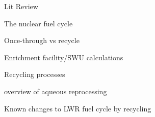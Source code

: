 \documentclass{report}
\begin{document}
\begin{outline}
\item Lit Review
\begin{outline}
    \item The nuclear fuel cycle
    \begin{outline}
          \item Once-through vs recycle \cite{tsoulfanidis_nuclear_2013}
          \item Enrichment facility/SWU calculations \cite{tsoulfanidis_nuclear_2013}
          \item Recycling processes \cite{tsoulfanidis_nuclear_2013}
          \begin{outline}
              \item overview of aqueous reprocessing 
              \item Known changes to LWR fuel cycle by recycling 
          \end{outline}
    \end{outline}
    

\end{outline}
\end{outline}
\end{document}
